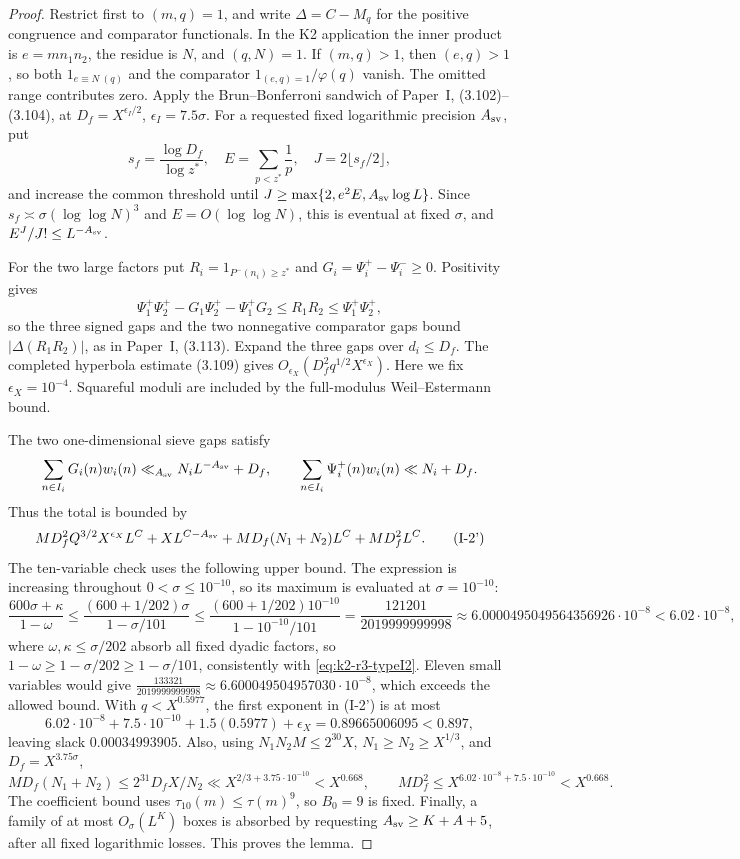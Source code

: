 \begin{proof}
Restrict first to \((m,q)=1\), and write \(\Delta=C-M_q\) for the positive
congruence and comparator functionals. In the K2 application the inner
product is \(e=mn_1n_2\), the residue is \(N\), and \((q,N)=1\). If
\((m,q)>1\), then \((e,q)>1\), so both \(1_{e\equiv N\ (q)}\) and the
comparator \(1_{(e,q)=1}/\varphi(q)\) vanish. The omitted range contributes
zero. Apply the Brun--Bonferroni sandwich
of Paper~I, (3.102)--(3.104), at
\(D_f=X^{\epsilon_I/2}\), \(\epsilon_I=7.5\sigma\). For a requested
fixed logarithmic precision \(A_{\rm sv}\), put
\[
 s_f=\frac{\log D_f}{\log z^*},\quad
 E=\sum_{p<z^*}\frac1p,\quad J=2\lfloor s_f/2\rfloor,
\]
and increase the common threshold until
\(J\ge\max\{2,e^2E,A_{\rm sv}\log L\}\). Since
\(s_f\asymp\sigma(\log\log N)^3\) and \(E=O(\log\log N)\), this is
eventual at fixed \(\sigma\), and \(E^J/J!\le L^{-A_{\rm sv}}\).

For the two large factors put \(R_i=1_{P^-(n_i)\ge z^*}\) and
\(G_i=\Psi_i^+-\Psi_i^-\ge0\). Positivity gives
\[
 \Psi_1^+\Psi_2^+-G_1\Psi_2^+-\Psi_1^+G_2
 \le R_1R_2\le\Psi_1^+\Psi_2^+,
\]
so the three signed gaps and the two nonnegative comparator gaps
bound \(|\Delta(R_1R_2)|\), as in Paper~I, (3.113). Expand the
three gaps over \(d_i\le D_f\). The completed hyperbola estimate (3.109)
 gives \(O_{\epsilon_X}(D_f^2q^{1/2}X^{\epsilon_X})\). Here we fix
\(\epsilon_X=10^{-4}\). Squareful moduli are included
by the full-modulus Weil--Estermann bound.

The two one-dimensional sieve gaps satisfy
\[
 \sum_{n\in I_i}G_i(n)w_i(n)\ll_{A_{\rm sv}}N_iL^{-A_{\rm sv}}+D_f,
 \qquad \sum_{n\in I_i}\Psi_i^+(n)w_i(n)\ll N_i+D_f.
\]
Thus the total is bounded by
\[
 M D_f^2Q^{3/2}X^{\epsilon_X}L^C+XL^{C-A_{\rm sv}}
 +M D_f(N_1+N_2)L^C+M D_f^2L^C. \tag{I-2'}
\]
The ten-variable check uses the following upper bound. The expression is increasing
throughout \(0<\sigma\le10^{-10}\), so its maximum is evaluated at
\(\sigma=10^{-10}\):
\[
 \frac{600\sigma+\kappa}{1-\omega}
 \le\frac{(600+1/202)\sigma}{1-\sigma/101}
 \le\frac{(600+1/202)10^{-10}}{1-10^{-10}/101}
 =\frac{121201}{2019999999998}
 \approx6.0000495049564356926\cdot10^{-8}<6.02\cdot10^{-8},
\]
where \(\omega,\kappa\le\sigma/202\) absorb all fixed dyadic factors,
so \(1-\omega\ge1-\sigma/202\ge1-\sigma/101\), consistently with
\eqref{eq:k2-r3-typeI2}.
Eleven small variables would give
\(\frac{133321}{2019999999998}\approx
6.600049504957030\cdot10^{-8}\), which exceeds the allowed bound.
With \(q<X^{0.5977}\), the first exponent in (I-2') is at most
\[
 6.02\cdot10^{-8}+7.5\cdot10^{-10}+1.5(0.5977)+\epsilon_X
 =0.89665006095<0.897,
\]
leaving slack \(0.00034993905\). Also, using
\(N_1N_2M\le2^{30}X\), \(N_1\ge N_2\ge X^{1/3}\), and
\(D_f=X^{3.75\sigma}\),
\[
 M D_f(N_1+N_2)\le2^{31}D_fX/N_2
 \ll X^{2/3+3.75\cdot10^{-10}}<X^{0.668},
 \qquad
 M D_f^2\le X^{6.02\cdot10^{-8}+7.5\cdot10^{-10}}<X^{0.668}.
\]
The coefficient bound uses
\(\tau_{10}(m)\le\tau(m)^9\), so \(B_0=9\) is fixed. Finally, a family of
at most \(O_\sigma(L^K)\) boxes is absorbed by requesting
\(A_{\rm sv}\ge K+A+5\), after all fixed logarithmic losses. This proves
the lemma.
\end{proof}


